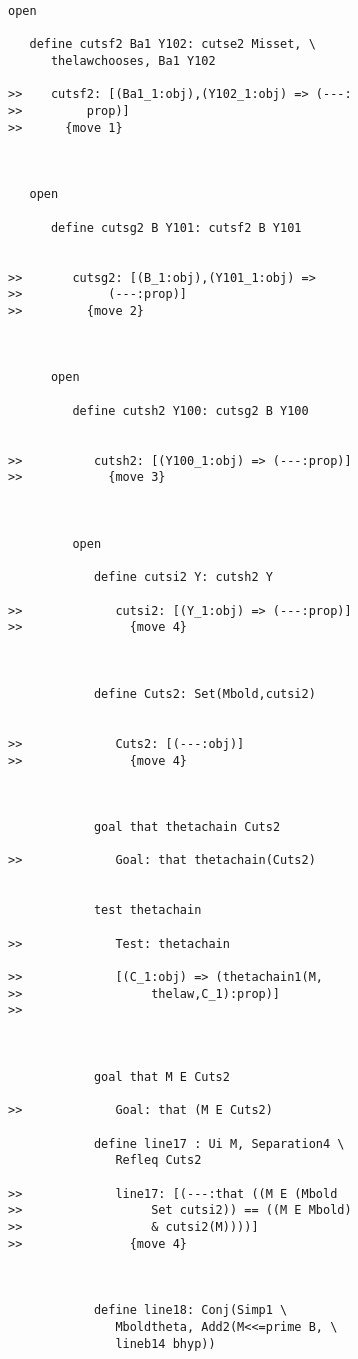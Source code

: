 \documentclass[12pt]{article}
\begin{document}
\begin{verbatim}
open

   define cutsf2 Ba1 Y102: cutse2 Misset, \
      thelawchooses, Ba1 Y102

>>    cutsf2: [(Ba1_1:obj),(Y102_1:obj) => (---:
>>         prop)]
>>      {move 1}



   open

      define cutsg2 B Y101: cutsf2 B Y101


>>       cutsg2: [(B_1:obj),(Y101_1:obj) =>
>>            (---:prop)]
>>         {move 2}



      open

         define cutsh2 Y100: cutsg2 B Y100


>>          cutsh2: [(Y100_1:obj) => (---:prop)]
>>            {move 3}



         open

            define cutsi2 Y: cutsh2 Y

>>             cutsi2: [(Y_1:obj) => (---:prop)]
>>               {move 4}



            define Cuts2: Set(Mbold,cutsi2)


>>             Cuts2: [(---:obj)]
>>               {move 4}



            goal that thetachain Cuts2

>>             Goal: that thetachain(Cuts2)


            test thetachain

>>             Test: thetachain

>>             [(C_1:obj) => (thetachain1(M,
>>                  thelaw,C_1):prop)]
>>               



            goal that M E Cuts2

>>             Goal: that (M E Cuts2)

            define line17 : Ui M, Separation4 \
               Refleq Cuts2

>>             line17: [(---:that ((M E (Mbold
>>                  Set cutsi2)) == ((M E Mbold)
>>                  & cutsi2(M))))]
>>               {move 4}



            define line18: Conj(Simp1 \
               Mboldtheta, Add2(M<<=prime B, \
               lineb14 bhyp))


\end{verbatim}
\end{document}
